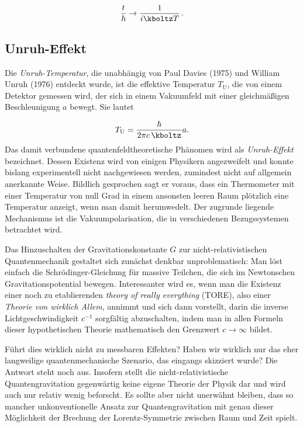\documentclass{scrartcl}
\begin{document}
\begin{equation*}
  \frac{t}{\hbar} \rightarrow \frac{1}{i \kboltz T}\,.
\end{equation*}


\subsection*{Unruh-Effekt}

Die \emph{Unruh-Temperatur}, die unabhängig von Paul Davies (1975) und William Unruh (1976) entdeckt wurde, ist die effektive Temperatur $T_{\text{U}}$, die von einem Detektor gemessen wird, der sich in einem Vakuumfeld mit einer gleichmäßigen Beschleunigung $a$ bewegt. Sie lautet

\begin{equation*}\label{eq:Unruh}
  T_{\text{U}}=\frac{\hbar}{2 \pi c\, \kboltz} a.
\end{equation*}
%
Das damit verbundene quantenfeldtheoretische Phänomen wird als \emph{Unruh-Effekt} bezeichnet. Dessen Existenz wird von einigen Physikern angezweifelt und konnte bislang experimentell nicht nachgewiesen werden, zumindest nicht auf allgemein anerkannte Weise. Bildlich gesprochen sagt er voraus, dass ein Thermometer mit einer Temperatur von null Grad in einem ansonsten leeren Raum plötzlich eine Temperatur anzeigt, wenn man damit herumwedelt. Der zugrunde liegende Mechanismus ist die Vakuumpolarisation, die in verschiedenen Bezugssystemen betrachtet wird.


\newpage {}
\label{sec:1010}

Das Hinzuschalten der Gravitationskonstante $G$ zur nicht-relativistischen Quantenmechanik gestaltet sich zunächst denkbar unproblematisch: Man löst einfach die Schrödinger-Gleichung für massive Teilchen, die sich im Newtonschen Gravitationspotential bewegen. Interessanter wird es, wenn man die Existenz einer noch zu etablierenden \emph{theory of really everything} (TORE), also einer \emph{Theorie von wirklich Allem}, 
annimmt und sich dann vorstellt, darin die inverse Lichtgeschwindigkeit $c^{−1}$ sorgfältig abzuschalten, indem man in allen Formeln dieser hypothetischen Theorie mathematisch den Grenzwert $c\rightarrow\infty$ bildet.

Führt dies wirklich nicht zu messbaren Effekten? Haben wir wirklich nur das eher langweilige quantenmechanische Szenario, das eingangs skizziert wurde? Die Antwort steht noch aus. Insofern stellt die nicht-relativistische Quantengravitation gegenwärtig keine eigene Theorie der Physik dar und wird auch nur relativ wenig beforscht. Es sollte aber nicht unerwähnt bleiben, dass so mancher unkonventionelle Ansatz zur Quantengravitation mit genau dieser Möglichkeit der Brechung der Lorentz-Symmetrie zwischen Raum und Zeit spielt.
\end{document}
